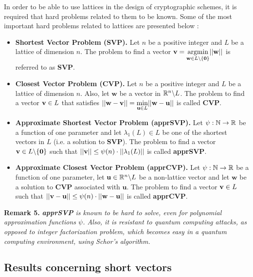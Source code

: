 In order to be able to use lattices in the design of cryptographic schemes, it is required that hard problems related to them to be known. Some of the most important hard problems related to lattices are presented below \cite{HPS08}:

\begin{itemize}
	\item  \textbf{Shortest Vector Problem (SVP).} Let $n$ be a positive integer and $L$ be a lattice of dimension $n$. The problem to find a vector $\textbf{v} = \displaystyle{\operatorname*{argmin}_{ \textbf{w} \in L \backslash \{\textbf{0}\}}} ||\textbf{w}||$ is referred to as \textbf{SVP}.\\
	
	\item \textbf{Closest Vector Problem (CVP).} Let $n$ be a positive integer and $L$ be a lattice of dimension $n$. Also, let $\textbf{w}$ be a vector in $\mathbb{R}^n \backslash L$. The problem to find a vector $\textbf{v}\in L$ that satisfies $||\textbf{w} - \textbf{v}|| = \displaystyle{\min_{ \textbf{u} \in L}} ||\textbf{w} - \textbf{u} || $ is called \textbf{CVP}.\\
	
	\item \textbf{Approximate Shortest Vector Problem (apprSVP).} Let $\psi : {\mathbb N} \rightarrow \mathbb{R}$ be a function of one parameter and let $\lambda_1(L) \in L$ be one of the shortest vectors in $L$ (i.e. a solution to \textbf{SVP}). The problem to find a vector $\textbf{v} \in L \backslash \{\textbf{0}\}$ such that $||\textbf{v}|| \leq \psi(n) \cdot || \lambda_1(L) ||$ is called \textbf{apprSVP}.\\

	\item \textbf{Approximate Closest Vector Problem (apprCVP).} Let $\psi : {\mathbb N} \rightarrow \mathbb{R}$ be a function of one parameter, let $\textbf{u} \in \mathbb{R}^n \backslash L$ be a non-lattice vector and let $\textbf{w}$ be a solution to \textbf{CVP} associated with $\textbf{u}$. The problem to find a vector $\textbf{v} \in L$ such that $||\textbf{v} - \textbf{u} || \leq \psi(n) \cdot ||\textbf{w} - \textbf{u}||$ is called \textbf{apprCVP}.
\end{itemize}

\textbf{Remark 5. } \textit{\textbf{apprSVP} is known to be hard to solve, even for polynomial approximation functions $\psi$. Also, it is resistant to quantum computing attacks, as opposed to integer factorization problem, which becomes easy in a quantum computing environment, using Schor's algorithm.}

\subsection{Results concerning short vectors}


